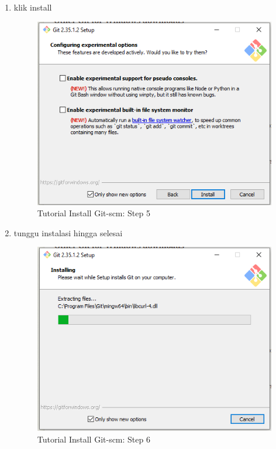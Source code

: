 \begin{enumerate}
\begin{figure}[H]
\end{figure}
\item klik install
\begin{figure}[H]
        \centerline{\includegraphics[scale=0.5]{figures/instalasi-git-scm-windows/step5}}
        \caption{Tutorial Install Git-scm: Step 5}
\end{figure}
\item tunggu instalasi hingga selesai
\begin{figure}[H]
        \centerline{\includegraphics[scale=0.5]{figures/instalasi-git-scm-windows/step6}}
        \caption{Tutorial Install Git-scm: Step 6}
\end{figure}

\end{enumerate}

